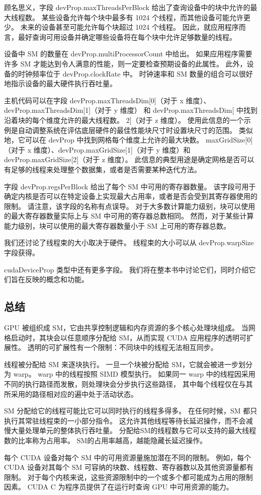 顾名思义，字段 devProp.maxThreadsPerBlock 给出了查询设备中的块中允许的最大线程数。 
某些设备允许每个块中最多有 1024 个线程，而其他设备可能允许更少。 未来的设备甚至可能允许每个块超过 1024 个线程。 
因此，就应用程序而言，最好查询可用设备并确定哪些设备将在每个块中允许足够数量的线程。

设备中 SM 的数量在 devProp.multiProcessorCount 中给出。 
如果应用程序需要许多 SM 才能达到令人满意的性能，则一定要检查预期设备的此属性。 
此外，设备的时钟频率位于 devProp.clockRate 中。 时钟速率和 SM 数量的组合可以很好地指示设备的最大硬件执行吞吐量。

主机代码可以在字段 devProp.maxThreadsDim[0]（对于 x 维度）、
devProp.maxThreadsDim[1]（对于 y 维度）
和 devProp.maxThreadsDim[ 中找到沿着块的每个维度允许的最大线程数。 2]（对于 z 维度）。 
使用此信息的一个示例是自动调整系统在评估底层硬件的最佳性能块尺寸时设置块尺寸的范围。 
类似地，它可以在 devProp 中找到网格每个维度上允许的最大块数。 
maxGridSize[0]（对于 x 维度）、devProp.maxGridSize[1]（对于 y 维度）和 devProp.maxGridSize[2]（对于 z 维度）。 
此信息的典型用途是确定网格是否可以有足够的线程来处理整个数据集，或者是否需要某种迭代方法。

字段 devProp.regsPerBlock 给出了每个 SM 中可用的寄存器数量。 
该字段可用于确定内核是否可以在特定设备上实现最大占用率，或者是否会受到其寄存器使用的限制。 
请注意，该字段的名称有点误导。 对于大多数计算能力级别，块可以使用的最大寄存器数量实际上与 SM 中可用的寄存器总数相同。 
然而，对于某些计算能力级别，块可以使用的最大寄存器数量小于 SM 上可用的寄存器总数。

我们还讨论了线程束的大小取决于硬件。 线程束的大小可以从 devProp.warpSize 字段获得。

cudaDeviceProp 类型中还有更多字段。 我们将在整本书中讨论它们，同时介绍它们旨在反映的概念和功能。

\subsection{总结}
GPU 被组织成 SM，它由共享控制逻辑和内存资源的多个核心处理块组成。 
当网格启动时，其块会以任意顺序分配给 SM，从而实现 CUDA 应用程序的透明可扩展性。 
透明的可扩展性有一个限制：不同块中的线程无法相互同步。

线程被分配给 SM 来逐块执行。 一旦一个块被分配给 SM，它就会被进一步划分为 warp。 
warp 中的线程按照 SIMD 模型执行。 如果同一 warp 中的线程因采用不同的执行路径而发散，则处理块会分步执行这些路径，
其中每个线程仅在与其所采用的路径相对应的遍中处于活动状态。

SM 分配给它的线程可能比它可以同时执行的线程多得多。 在任何时候，SM 都只执行其常驻线程束的一小部分指令。 
这允许其他线程等待长延迟操作，而不会减慢大量处理单元的整体执行吞吐量。 
分配给SM的线程数与它可以支持的最大线程数的比率称为占用率。 SM的占用率越高，越能隐藏长延迟操作。

每个 CUDA 设备对每个 SM 中的可用资源量施加潜在不同的限制。 
例如，每个 CUDA 设备对其每个 SM 可容纳的块数、线程数、寄存器数以及其他资源量都有限制。 
对于每个内核来说，这些资源限制中的一个或多个都可能成为占用的限制因素。 
CUDA C 为程序员提供了在运行时查询 GPU 中可用资源的能力。